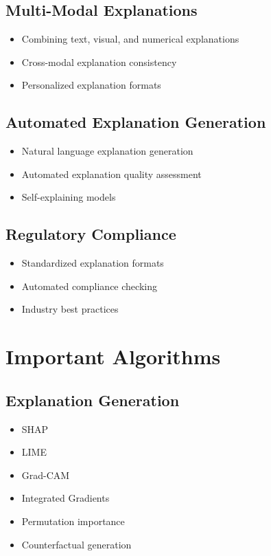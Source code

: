 \documentclass[11pt]{article}
\theoremstyle{definition}
\begin{document}
\subsection{Multi-Modal Explanations}
\begin{itemize}
    \item Combining text, visual, and numerical explanations
    \item Cross-modal explanation consistency
    \item Personalized explanation formats
\end{itemize}

\subsection{Automated Explanation Generation}
\begin{itemize}
    \item Natural language explanation generation
    \item Automated explanation quality assessment
    \item Self-explaining models
\end{itemize}

\subsection{Regulatory Compliance}
\begin{itemize}
    \item Standardized explanation formats
    \item Automated compliance checking
    \item Industry best practices
\end{itemize}

\section{Important Algorithms}

\subsection{Explanation Generation}
\begin{itemize}
    \item SHAP
    \item LIME
    \item Grad-CAM
    \item Integrated Gradients
    \item Permutation importance
    \item Counterfactual generation
\end{itemize}
\end{document}
